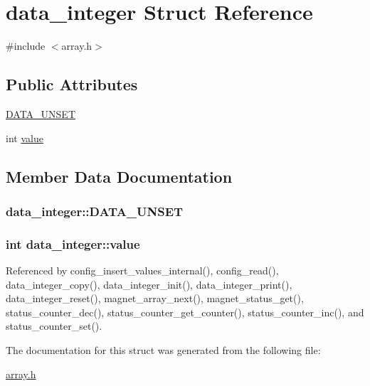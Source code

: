 \hypertarget{structdata__integer}{\section{data\-\_\-integer Struct Reference}
\label{structdata__integer}
}


{\ttfamily \#include $<$array.\-h$>$}

\subsection*{Public Attributes}
\begin{DoxyCompactItemize}
\item 
\hyperlink{structdata__integer_abd496af4097eea076ee3bb09cfceca3c}{D\-A\-T\-A\-\_\-\-U\-N\-S\-E\-T}
\item 
int \hyperlink{structdata__integer_a678b05379e2e2a61971b610e5e429c5e}{value}
\end{DoxyCompactItemize}


\subsection{Member Data Documentation}
\hypertarget{structdata__integer_abd496af4097eea076ee3bb09cfceca3c}{
\subsubsection[{D\-A\-T\-A\-\_\-\-U\-N\-S\-E\-T}]{\setlength{\rightskip}{0pt plus 5cm}data\-\_\-integer\-::\-D\-A\-T\-A\-\_\-\-U\-N\-S\-E\-T}}\label{structdata__integer_abd496af4097eea076ee3bb09cfceca3c}
\hypertarget{structdata__integer_a678b05379e2e2a61971b610e5e429c5e}{
\subsubsection[{value}]{\setlength{\rightskip}{0pt plus 5cm}int data\-\_\-integer\-::value}}\label{structdata__integer_a678b05379e2e2a61971b610e5e429c5e}


Referenced by config\-\_\-insert\-\_\-values\-\_\-internal(), config\-\_\-read(), data\-\_\-integer\-\_\-copy(), data\-\_\-integer\-\_\-init(), data\-\_\-integer\-\_\-print(), data\-\_\-integer\-\_\-reset(), magnet\-\_\-array\-\_\-next(), magnet\-\_\-status\-\_\-get(), status\-\_\-counter\-\_\-dec(), status\-\_\-counter\-\_\-get\-\_\-counter(), status\-\_\-counter\-\_\-inc(), and status\-\_\-counter\-\_\-set().



The documentation for this struct was generated from the following file\-:\begin{DoxyCompactItemize}
\item 
\hyperlink{array_8h}{array.\-h}\end{DoxyCompactItemize}
